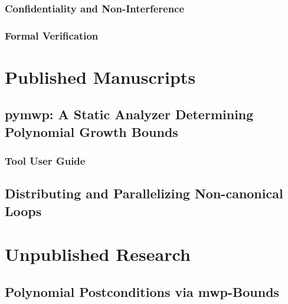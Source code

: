         \subsection{Confidentiality and Non-Interference}
        \label{pl-sec}
        

        \subsection{Formal Verification}
        \label{verification}
        

\chapter{Published Manuscripts}\label{published-manuscripts}
\clearpage

    \section{pymwp: A Static Analyzer Determining Polynomial Growth Bounds}
    \label{sec:atva}
    
    \clearpage

    \subsection{Tool User Guide}\label{app:toolguide}
    
    \clearpage

    \section{Distributing and Parallelizing Non-canonical Loops}
    \label{sec:vmcai}
    
    \clearpage

\chapter{Unpublished Research}\label{ch:unpublished-research}
\clearpage

    \section{Polynomial Postconditions via mwp-Bounds}\label{sec:postcond}
    
    \clearpage

